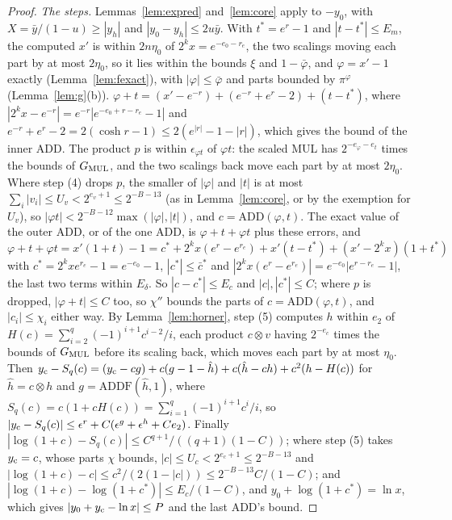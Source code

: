 \begin{proof}
\emph{The steps.} Lemmas~\ref{lem:expred} and~\ref{lem:core} apply to $-y_0$, with $X = \bar y/(1-u) \ge |y_h|$ and $|y_0 -
y_h| \le 2u\bar y$. With $t^* = e^r - 1$ and $|t - t^*| \le E_m$, the computed $x'$ is within $2n\eta_0$ of $2^kx = e^{-e_0
- r_e}$, the two scalings moving each part by at most $2\eta_0$, so it lies within the bounds $\xi$ and $1 - \bar \varphi$,
and $\varphi = x' - 1$ exactly (Lemma~\ref{lem:fexact}), with $|\varphi| \le \bar \varphi$ and parts bounded by $\pi^\varphi$
(Lemma~\ref{lem:g}(b)). $\varphi + t = (x' - e^{-r}) + (e^{-r} + e^r - 2) + (t - t^*)$, where $|2^kx - e^{-r}| = e^{-r}|e^{-e_0
+ r - r_e} - 1|$ and $e^{-r} + e^r - 2 = 2(\cosh r - 1) \le 2(e^{|r|} - 1 - |r|)$, which gives the bound of the inner
ADD. The product $p$ is within $\epsilon_{\varphi t}$ of $\varphi t$: the scaled MUL has $2^{-e_\varphi-e_t}$ times the bounds of $G_{\rm
MUL}$, and the two scalings back move each part by at most $2\eta_0$. Where step (4) drops $p$, the smaller of $|\varphi|$ and
$|t|$ is at most $\sum_i|v_i| \le U_v < 2^{e_v+1} \le 2^{-B-13}$ (as in Lemma~\ref{lem:core}, or by the exemption for
$U_v$), so $|\varphi t| < 2^{-B-12}\max(|\varphi|, |t|)$, and $c = \mathrm{ADD}(\varphi, t)$. The exact value of the outer ADD, or of the
one ADD, is $\varphi + t + \varphi t$ plus these errors, and $\varphi + t + \varphi t = x'(1 + t) - 1 = c^* + 2^kx(e^r - e^{r_e}) + x'(t - t^*) +
(x' - 2^kx)(1 + t^*)$ with $c^* = 2^kxe^{r_e} - 1 = e^{-e_0} - 1$, $|c^*| \le \bar c^*$ and $|2^kx(e^r - e^{r_e})| =
e^{-e_0}|e^{r - r_e} - 1|$, the last two terms within $E_\delta$. So $|c - c^*| \le E_c$ and $|c|, |c^*| \le C$; where $p$
is dropped, $|\varphi + t| \le C$ too, so $\chi''$ bounds the parts of $c = \mathrm{ADD}(\varphi, t)$, and $|c_i| \le \chi_i$ either
way. By Lemma~\ref{lem:horner}, step (5) computes $h$ within $e_2$ of $H(c) =
\sum_{i=2}^q(-1)^{i+1}c^{i-2}/i$, each product $c \otimes v$ having $2^{-e_c}$ times the bounds of $G_{\rm MUL}$ before its scaling
back, which moves each part by at most $\eta_0$. Then $y_{\rm c} - S_q(c) = (y_{\rm c} - cg) + c(g - 1 - \hat h) + c(\hat h -
ch) + c^2(h - H(c))$ for $\hat h = c \otimes h$ and $g = \mathrm{ADDF}(\hat h, 1)$, where $S_q(c) = c(1 + cH(c)) =
\sum_{i=1}^q(-1)^{i+1}c^i/i$, so $|y_{\rm c} - S_q(c)| \le \epsilon^r + C(\epsilon^g + \epsilon^h + Ce_2)$. Finally
$|\log(1+c) - S_q(c)| \le C^{q+1}/((q+1)(1 - C))$; where step (5) takes $y_{\rm c} = c$, whose parts $\chi$ bounds, $|c|
\le U_c < 2^{e_c+1} \le 2^{-B-13}$ and $|\log(1+c) - c| \le c^2/(2(1 - |c|)) \le 2^{-B-13}C/(1-C)$; and $|\log(1+c) -
\log(1+c^*)| \le E_c/(1-C)$, and $y_0 + \log(1 + c^*) = \ln x$, which gives $|y_0 + y_{\rm c} - \ln x| \le P$ and the last
ADD's bound.


\end{proof}
